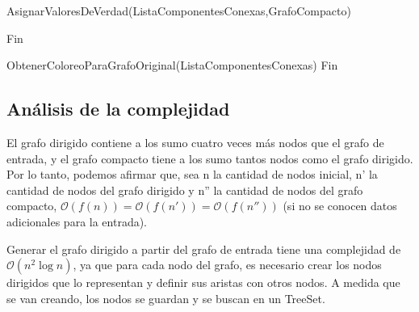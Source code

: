 \begin{algorithmic}
\newcommand{\INDSTATE}[1][1]{\STATE\hspace{#1\algorithmicindent}}
\STATE AsignarValoresDeVerdad(ListaComponentesConexas,GrafoCompacto)
	\INDSTATE[2]{Para cada componente ListaComponentesConexas}
		\INDSTATE[4]{Si no esta marcada componente}
			\INDSTATE[6]{marcar(componente,false)}
			\INDSTATE[6]{propagar false a todas las componentes que poseen un camino hasta esta componente en GrafoCompacto}
			\INDSTATE[6]{Si inconsistencia al propagar}
				\INDSTATE[8]{Devolver INVALIDO}

			\INDSTATE[6]{marcar(componente.negacionAsociada,true)}
			\INDSTATE[6]{propagar true a todas las componentes accesibles desde componente.negacionAsociada en GrafoCompacto}
			\INDSTATE[6]{Si inconsistencia al propagar}
				\INDSTATE[8]{Devolver INVALIDO}
\STATE
	\INDSTATE[2]{Devolver VALIDO}

\STATE Fin
\end{algorithmic}

\begin{algorithmic}
\newcommand{\INDSTATE}[1][1]{\STATE\hspace{#1\algorithmicindent}}
\STATE ObtenerColoreoParaGrafoOriginal(ListaComponentesConexas)
	\INDSTATE[2]{Colores = vacio}
	\INDSTATE[2]{Para cada componente con valor true en ListaComponentesConexas}
		\INDSTATE[4]{Para cada nodo con proposicion afirmativa de componente}
			\INDSTATE[6]{Colores.asignar_color(nodo.nodoDeGrafoOriginal.identidad,nodo.colorPropuesto)}
	\INDSTATE[2]{Devolver Colores}
\STATE Fin
\end{algorithmic}


\subsection{Análisis de la complejidad}
El grafo dirigido contiene a los sumo cuatro veces más nodos que el grafo de entrada, y el grafo compacto tiene a los sumo tantos nodos como el grafo dirigido. Por lo tanto, podemos afirmar que, sea n la cantidad de nodos inicial, n' la cantidad de nodos del grafo dirigido y n'' la cantidad de nodos del grafo compacto, $\mathcal{O}(f(n)) = \mathcal{O}(f(n')) = \mathcal{O}(f(n''))$ (si no se conocen datos adicionales para la entrada).

Generar el grafo dirigido a partir del grafo de entrada tiene una complejidad de $\mathcal{O}(n^2\log{n})$, ya que para cada nodo del grafo, es necesario crear los nodos dirigidos que lo representan y definir sus aristas con otros nodos. A medida que se van creando, los nodos se guardan y se buscan en un TreeSet.

